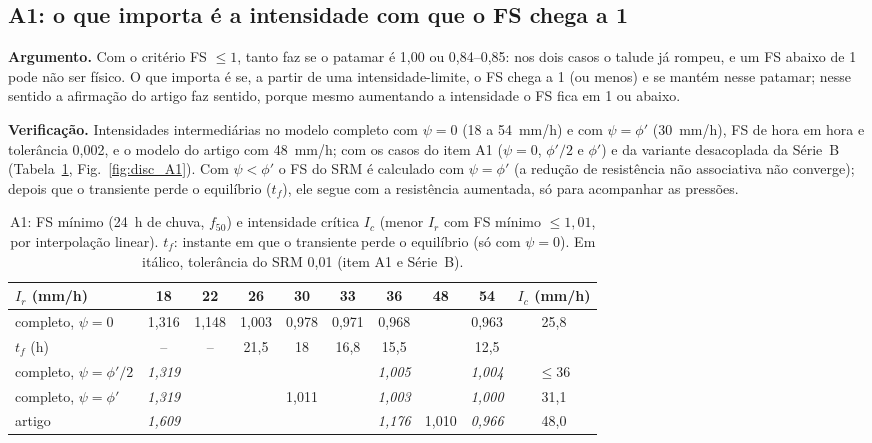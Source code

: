 \subsection{A1: o que importa \'e a intensidade com que o FS chega a 1}

\textbf{Argumento.} Com o crit\'erio FS $\le1$, tanto faz se o patamar \'e 1,00 ou 0,84--0,85: nos dois casos o
talude j\'a rompeu, e um FS abaixo de 1 pode n\~ao ser f\'isico. O que importa \'e se, a partir de uma
intensidade-limite, o FS chega a 1 (ou menos) e se mant\'em nesse patamar; nesse sentido a afirma\c{c}\~ao do artigo
faz sentido, porque mesmo aumentando a intensidade o FS fica em 1 ou abaixo.

\textbf{Verifica\c{c}\~ao.} Intensidades intermedi\'arias no modelo completo com $\psi=0$ (18 a 54~mm/h) e com
$\psi=\phi'$ (30~mm/h), FS de hora em hora e toler\^ancia 0,002, e o modelo do artigo com 48~mm/h; com os casos do
item A1 ($\psi=0$, $\phi'/2$ e $\phi'$) e da variante desacoplada da S\'erie~B (Tabela~\ref{tab:disc_A1},
Fig.~\ref{fig:disc_A1}). Com $\psi<\phi'$ o FS do SRM \'e calculado com $\psi=\phi'$ (a redu\c{c}\~ao de
resist\^encia n\~ao associativa n\~ao converge); depois que o transiente perde o equil\'ibrio ($t_f$), ele segue com a
resist\^encia aumentada, s\'o para acompanhar as press\~oes.

\begin{table}[h!]
\centering\small
\caption{A1: FS m\'inimo (24~h de chuva, $f_{50}$) e intensidade cr\'itica $I_c$ (menor $I_r$ com FS m\'inimo
$\le1{,}01$, por interpola\c{c}\~ao linear). $t_f$: instante em que o transiente perde o equil\'ibrio (s\'o com
$\psi=0$). Em it\'alico, toler\^ancia do SRM 0,01 (item A1 e S\'erie~B).}\label{tab:disc_A1}
\setlength{\tabcolsep}{4pt}
\begin{tabular}{lccccccccc}
\toprule
$I_r$ (mm/h) & 18 & 22 & 26 & 30 & 33 & 36 & 48 & 54 & $I_c$ (mm/h)\\
\midrule
completo, $\psi=0$ & 1,316 & 1,148 & 1,003 & 0,978 & 0,971 & 0,968 & & 0,963 & 25,8\\
\quad $t_f$ (h) & -- & -- & 21,5 & 18 & 16,8 & 15,5 & & 12,5 &\\
completo, $\psi=\phi'/2$ & \emph{1,319} & & & & & \emph{1,005} & & \emph{1,004} & $\le36$\\
completo, $\psi=\phi'$ & \emph{1,319} & & & 1,011 & & \emph{1,003} & & \emph{1,000} & 31,1\\
artigo & \emph{1,609} & & & & & \emph{1,176} & 1,010 & \emph{0,966} & 48,0\\
\bottomrule
\end{tabular}
\end{table}

